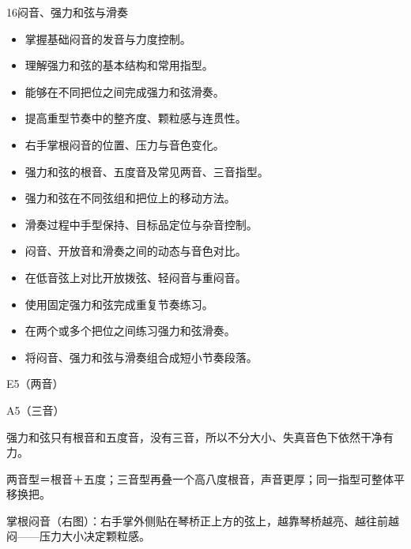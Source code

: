 \begin{lessoncard}{16}{闷音、强力和弦与滑奏}
\begin{itemize}
\item 掌握基础闷音的发音与力度控制。
\item 理解强力和弦的基本结构和常用指型。
\item 能够在不同把位之间完成强力和弦滑奏。
\item 提高重型节奏中的整齐度、颗粒感与连贯性。
\end{itemize}
\begin{itemize}
\item 右手掌根闷音的位置、压力与音色变化。
\item 强力和弦的根音、五度音及常见两音、三音指型。
\item 强力和弦在不同弦组和把位上的移动方法。
\item 滑奏过程中手型保持、目标品定位与杂音控制。
\item 闷音、开放音和滑奏之间的动态与音色对比。
\end{itemize}
\begin{itemize}
\item 在低音弦上对比开放拨弦、轻闷音与重闷音。
\item 使用固定强力和弦完成重复节奏练习。
\item 在两个或多个把位之间练习强力和弦滑奏。
\item 将闷音、强力和弦与滑奏组合成短小节奏段落。
\end{itemize}
\begin{fignote}
\begin{center}
\begin{chordbox}{E5（两音）}
\end{chordbox}\hspace{10mm}%
\begin{chordbox}{A5（三音）}
\end{chordbox}\hspace{10mm}%
\end{center}
\begin{fignotes}
\item 强力和弦只有根音和五度音，没有三音，所以不分大小、失真音色下依然干净有力。
\item 两音型＝根音＋五度；三音型再叠一个高八度根音，声音更厚；同一指型可整体平移换把。
\item 掌根闷音（右图）：右手掌外侧贴在琴桥正上方的弦上，越靠琴桥越亮、越往前越闷——压力大小决定颗粒感。
\end{fignotes}
\end{fignote}
\end{lessoncard}

